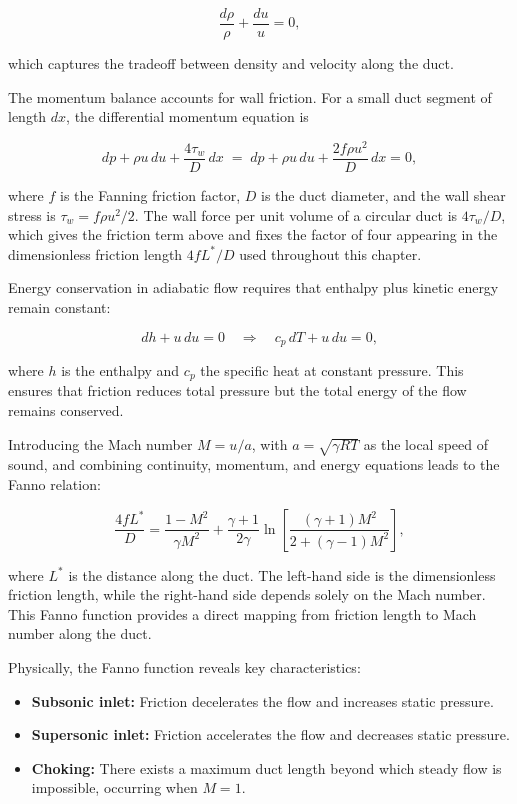\documentclass[11pt,a4paper]{report}
\begin{document}
\[
\frac{d\rho}{\rho} + \frac{du}{u} = 0,
\]

which captures the tradeoff between density and velocity along the duct.

The momentum balance accounts for wall friction. For a small duct segment of length \(dx\), the differential momentum equation is

\[
dp + \rho u\, du + \frac{4 \tau_w}{D}\, dx \;=\; dp + \rho u\, du + \frac{2 f \rho u^{2}}{D}\, dx = 0,
\]

where \(f\) is the Fanning friction factor, \(D\) is the duct diameter, and the wall shear stress is \(\tau_w = f \rho u^{2} / 2\). The wall force per unit volume of a circular duct is \(4\tau_w/D\), which gives the friction term above and fixes the factor of four appearing in the dimensionless friction length \(4fL^{*}/D\) used throughout this chapter.

Energy conservation in adiabatic flow requires that enthalpy plus kinetic energy remain constant:

\[
dh + u\, du = 0 \quad \Rightarrow \quad c_p\, dT + u\, du = 0,
\]

where \(h\) is the enthalpy and \(c_p\) the specific heat at constant pressure. This ensures that friction reduces total pressure but the total energy of the flow remains conserved.

Introducing the Mach number \(M = u/a\), with \(a = \sqrt{\gamma R T}\) as the local speed of sound, and combining continuity, momentum, and energy equations leads to the Fanno relation:

\[
\frac{4 f L^*}{D} = \frac{1 - M^2}{\gamma M^2} + \frac{\gamma+1}{2\gamma} \ln \left[ \frac{(\gamma+1) M^2}{2 + (\gamma-1) M^2} \right],
\]

where \(L^*\) is the distance along the duct. The left-hand side is the dimensionless friction length, while the right-hand side depends solely on the Mach number. This Fanno function provides a direct mapping from friction length to Mach number along the duct.

Physically, the Fanno function reveals key characteristics:

\begin{itemize}
    \item \textbf{Subsonic inlet:} Friction decelerates the flow and increases static pressure.  
    \item \textbf{Supersonic inlet:} Friction accelerates the flow and decreases static pressure.  
    \item \textbf{Choking:} There exists a maximum duct length beyond which steady flow is impossible, occurring when \(M = 1\).
\end{itemize}
\end{document}
